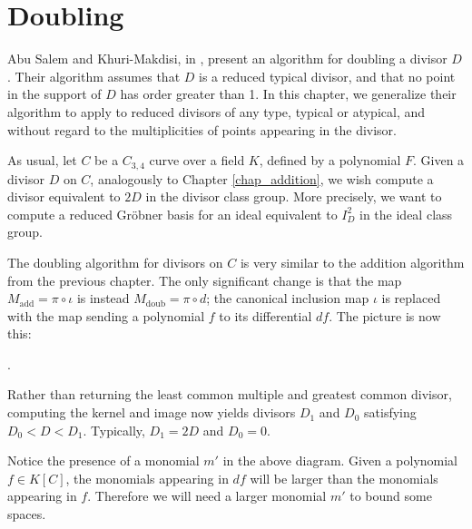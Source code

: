 
\section{Doubling}
\label{chap_doubling}

Abu Salem and Khuri-Makdisi, in \cite{salem07}, present an algorithm for doubling a divisor $D$.
Their algorithm assumes that $D$ is a reduced typical divisor,
and that no point in the support of $D$ has order greater than 1.
In this chapter, we generalize their algorithm to apply to reduced divisors of any type,
typical or atypical, and without regard to the multiplicities of points appearing in the divisor.

As usual, let $C$ be a $C_{3,4}$ curve over a field $K$, defined by a polynomial $F$.
Given a divisor $D$ on $C$, analogously to Chapter \ref{chap_addition},
we wish compute a divisor equivalent to $2D$ in the divisor class group.
More precisely, we want to compute a reduced Gr\"obner basis for an ideal equivalent to $I_D^2$ in the ideal class group.

The doubling algorithm for divisors on $C$ is very similar to the addition algorithm from the previous chapter.
The only significant change is that the map $M_{\text{add}} = \pi \circ \iota$ is instead $M_{\text{doub}} = \pi \circ d$;
the canonical inclusion map $\iota$ is replaced with the map sending a polynomial $f$ to its differential $df$.
The picture is now this:
\begin{center}
  .
\end{center}
Rather than returning the least common multiple and greatest common divisor,
computing the kernel and image now yields divisors $D_1$ and $D_0$ satisfying $D_0 < D < D_1$.
Typically, $D_1 = 2D$ and $D_0 = 0$.

Notice the presence of a monomial $m'$ in the above diagram.
Given a polynomial $f \in K[C]$, the monomials appearing in $df$ will be larger than the monomials appearing in $f$.
Therefore we will need a larger monomial $m'$ to bound some spaces.

